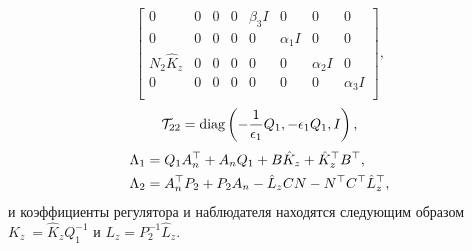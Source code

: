 \begin{theorem}
\begin{equation}
\begin{bmatrix}
			0&0&0&0&\beta_3{I}&0&0&0\\
			0&0&0&0&0& \alpha_1{I}&0&0\\
			{N}_2\hat{{K}}_z&0&0&0&0&0& \alpha_2{I}&0\\
			0&0&0&0&0&0&0&\alpha_3{I}\\
		\end{bmatrix},
	\end{equation}
	\begin{equation}
		\mathcal{T}_{22}=\textnormal{diag}\left(-\frac{1}{\epsilon_1}{Q}_1,-\epsilon_1{Q}_1,{I}\right),
	\end{equation}%
	\begin{align}
		\label{eq:Lambda_1}
		{\Lambda}_1&={Q}_1{A}_n^\top+{A}_n{Q}_1+{B}\hat{{K}}_z+\hat{{K}}_z^\top{B}^\top, \\
		\label{eq:Lambda_2}
		{\Lambda}_2&={A}_n^\top{P}_2+{P}_2{A}_n-\hat{{L}}_z{C}{N}-{N}^\top{C}^\top\hat{{L}}_z^\top,
	\end{align}
	и коэффициенты регулятора и наблюдателя находятся следующим образом ${K}_z\ = \hat{{K}}_z{Q}_1^{-1}$ и ${L}_z = {P}_2^{-1} \hat{{L}}_z$.
\end{theorem}

